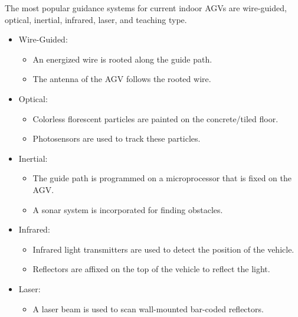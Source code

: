 \documentclass[letterpaper,12pt,oneside]{book}
\begin{document}
		The most popular guidance systems for current indoor AGVs are wire-guided, optical, inertial, infrared, laser, and teaching type. \cite{KESH}
		\begin{itemize}
			\item Wire-Guided:
			\begin{itemize}
				\item An energized wire is rooted along the guide path. 
				\item The antenna of the AGV follows the rooted wire.
			\end{itemize}
			\item Optical:
			\begin{itemize}
				\item Colorless florescent particles are painted on the concrete/tiled floor. 
				\item Photosensors are used to track these particles.
			\end{itemize}
			\item Inertial:
			\begin{itemize}
				\item The guide path is programmed on a microprocessor that is fixed on the AGV. 
				\item A sonar system is incorporated for finding obstacles.
			\end{itemize}
			\item Infrared:
			\begin{itemize}
				\item Infrared light transmitters are used to detect the position of the vehicle.
				\item Reflectors are affixed on the top of the vehicle to reflect the light.
			\end{itemize}
			\item Laser:
			\begin{itemize}
				\item A laser beam is used to scan wall-mounted bar-coded reflectors.

\end{itemize}
\end{itemize}
\end{document}
